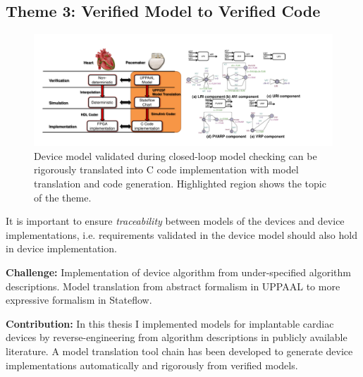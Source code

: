 \documentclass[a4paper,11pt]{article}
\begin{document}
\subsection{Theme 3: Verified Model to Verified Code}
\begin{figure}[t]
	\centering
	\includegraphics[scale=0.32]{figs/mb_device.pdf}
	\caption{\small Device model validated during closed-loop model checking can be rigorously translated into C code implementation with model translation and code generation. Highlighted region shows the topic of the theme.}
	\label{fig:mb_device}
\end{figure}
It is important to ensure \emph{traceability} between models of the devices and device implementations, i.e. requirements validated in the device model should also hold in device implementation.

\noindent\textbf{Challenge:} Implementation of device algorithm from under-specified algorithm descriptions. Model translation from abstract formalism in UPPAAL to more expressive formalism in Stateflow.

\noindent\textbf{Contribution:}
In this thesis I implemented models for implantable cardiac devices by reverse-engineering from algorithm descriptions in publicly available literature.
A model translation tool chain has been developed to generate device implementations automatically and rigorously from verified models.
\end{document}

